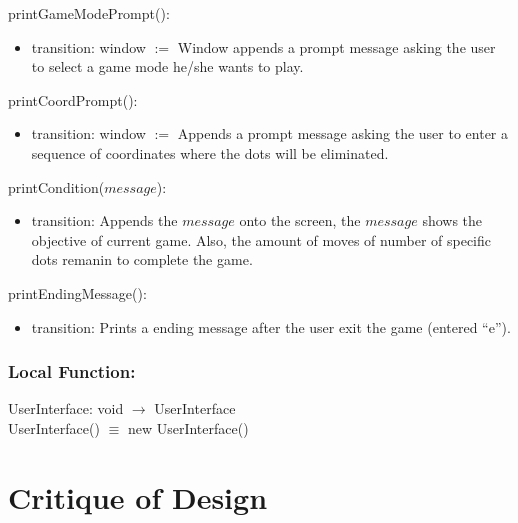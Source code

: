 \documentclass[12pt]{article}
\begin{document}
\noindent printGameModePrompt():
\begin{itemize}
\item transition: window $:=$ Window appends a prompt message asking the user to select a
                              game mode he/she wants to play.
\end{itemize}

\noindent printCoordPrompt():
\begin{itemize}
\item transition: window $:=$ Appends a prompt message asking the user to enter a sequence
                              of coordinates where the dots will be eliminated.
\end{itemize}

\noindent printCondition($message$):
\begin{itemize}
\item transition: Appends the $message$ onto the screen, the $message$ shows the objective of current game. Also, the amount of moves
                  of number of specific dots remanin to complete the game.
\end{itemize}

\noindent printEndingMessage():
\begin{itemize}
\item transition: Prints a ending message after the user exit the game (entered ``e'').
\end{itemize}

\subsubsection*{Local Function:}

UserInterface: void $\rightarrow$ UserInterface \\
UserInterface() $\equiv$ new UserInterface()

\newpage

\section*{Critique of Design}
\end{document}
